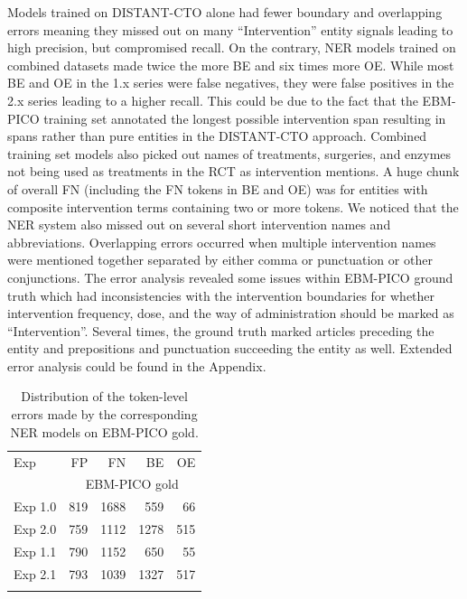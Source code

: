 \documentclass[11pt]{article}
\begin{document}
Models trained on DISTANT-CTO alone had fewer boundary and overlapping errors meaning they missed out on many ``Intervention'' entity signals leading to high precision, but compromised recall.
On the contrary, NER models trained on combined datasets made twice the more BE and six times more OE.
While most BE and OE in the 1.x series were false negatives, they were false positives in the 2.x series leading to a higher recall.
This could be due to the fact that the EBM-PICO training set annotated the longest possible intervention span resulting in spans rather than pure entities in the DISTANT-CTO approach.
Combined training set models also picked out names of treatments, surgeries, and enzymes not being used as treatments in the RCT as intervention mentions.
A huge chunk of overall FN (including the FN tokens in BE and OE) was for entities with composite intervention terms containing two or more tokens.
We noticed that the NER system also missed out on several short intervention names and abbreviations.
Overlapping errors occurred when multiple intervention names were mentioned together separated by either comma or punctuation or other conjunctions.
The error analysis revealed some issues within EBM-PICO ground truth which had inconsistencies with the intervention boundaries for whether intervention frequency, dose, and the way of administration should be marked as ``Intervention''.
Several times, the ground truth marked articles preceding the entity and prepositions and punctuation succeeding the entity as well.
Extended error analysis could be found in the Appendix.
\begin{table}[ht]
\centering
    \begin{tabular}{l|rrrr}
        \Xhline{1pt}
        Exp     & FP & FN & BE & OE\\
         & \multicolumn{4}{c}{EBM-PICO gold} \\
        \Xhline{1pt}
        Exp 1.0 &  819  &  1688  &  559  &  66 \\
        Exp 2.0 &  759  &  1112  &  1278  &  515 \\
        Exp 1.1 &  790  &  1152  &  650  &  55 \\
        Exp 2.1 &  793  &  1039  &  1327 & 517 \\
        \Xhline{1pt}
    \end{tabular}
    \caption{Distribution of the token-level errors made by the corresponding NER models on EBM-PICO gold.}
    \label{tab:error_ner}
\end{table}
\end{document}
